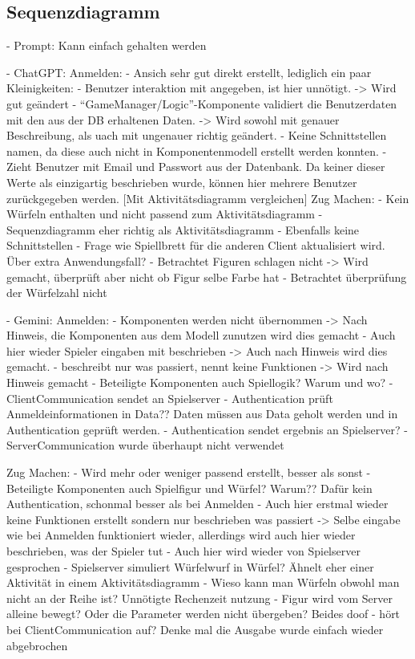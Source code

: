 \subsection*{Sequenzdiagramm}

- Prompt: Kann einfach gehalten werden

- ChatGPT:
    Anmelden:
        - Ansich sehr gut direkt erstellt, lediglich ein paar Kleinigkeiten:
        - Benutzer interaktion mit angegeben, ist hier unnötigt. -> Wird gut geändert
        - ``GameManager/Logic''-Komponente validiert die Benutzerdaten mit den aus der DB erhaltenen Daten. -> Wird sowohl mit genauer Beschreibung, als uach mit ungenauer richtig 
        geändert.
        - Keine Schnittstellen namen, da diese auch nicht in Komponentenmodell erstellt werden konnten.
        - Zieht Benutzer mit Email und Passwort aus der Datenbank. Da keiner dieser Werte als einzigartig beschrieben wurde, können hier mehrere Benutzer zurückgegeben werden.
        [Mit Aktivitätsdiagramm vergleichen]
    Zug Machen:
        - Kein Würfeln enthalten und nicht passend zum Aktivitätsdiagramm
        - Sequenzdiagramm eher richtig als Aktivitätsdiagramm
        - Ebenfalls keine Schnittstellen
        - Frage wie Spiellbrett für die anderen Client aktualisiert wird. Über extra Anwendungsfall?
        - Betrachtet Figuren schlagen nicht -> Wird gemacht, überprüft aber nicht ob Figur selbe Farbe hat
        - Betrachtet überprüfung der Würfelzahl nicht

- Gemini:
    Anmelden:
        - Komponenten werden nicht übernommen -> Nach Hinweis, die Komponenten aus dem Modell zunutzen wird dies gemacht
        - Auch hier wieder Spieler eingaben mit beschrieben -> Auch nach Hinweis wird dies gemacht.
        - beschreibt nur was passiert, nennt keine Funktionen -> Wird nach Hinweis gemacht
        - Beteiligte Komponenten auch Spiellogik? Warum und wo?
        - ClientCommunication sendet an Spielserver
        - Authentication prüft Anmeldeinformationen in Data?? Daten müssen aus Data geholt werden und in Authentication geprüft werden.
        - Authentication sendet ergebnis an Spielserver?
        - ServerCommunication wurde überhaupt nicht verwendet
    
    Zug Machen:
        - Wird mehr oder weniger passend erstellt, besser als sonst
        - Beteiligte Komponenten auch Spielfigur und Würfel? Warum?? Dafür kein Authentication, schonmal besser als bei Anmelden
        - Auch hier erstmal wieder keine Funktionen erstellt sondern nur beschrieben was passiert -> Selbe eingabe wie bei Anmelden funktioniert
        wieder, allerdings wird auch hier wieder beschrieben, was der Spieler tut
        - Auch hier wird wieder von Spielserver gesprochen
        - Spielserver simuliert Würfelwurf in Würfel? Ähnelt eher einer Aktivität in einem Aktivitätsdiagramm
        - Wieso kann man Würfeln obwohl man nicht an der Reihe ist? Unnötigte Rechenzeit nutzung
        - Figur wird vom Server alleine bewegt? Oder die Parameter werden nicht übergeben? Beides doof
        - hört bei ClientCommunication auf? Denke mal die Ausgabe wurde einfach wieder abgebrochen 



